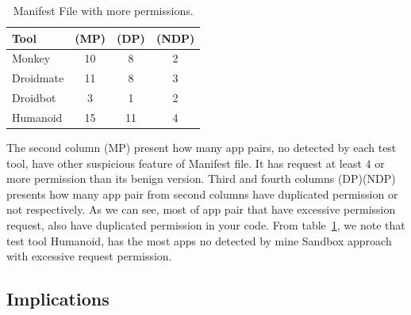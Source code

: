 \begin{table}[ht]
  \caption{Manifest File with more permissions.}
  \centering
  \begin{small}
 \begin{tabular}{lccc}
   \toprule
   Tool & (MP) & (DP) & (NDP) \\   \midrule
   Monkey &  10 & 8 & 2 \\ 
   Droidmate &  11 & 8 & 3 \\ 
   Droidbot &  3 & 1 & 2 \\ 
   Humanoid &  15 & 11 & 4 \\ 
 \bottomrule
 \end{tabular}
 \end{small}
 \label{tab:mp}
\end{table}

The second column (MP) present how many app pairs, no detected by each test tool, have other suspicious feature of Manifest file. It has request at least $4$ or more permission than its benign version. Third and fourth columns (DP)(NDP) presents how many app pair from second columns have duplicated permission or not respectively. As we can see, most of app pair that have excessive permission request, also have duplicated permission in your code. From table~\ref{tab:mp}, we note that test tool Humanoid, has the most apps no detected by mine Sandbox approach with excessive request permission.


\subsection{Implications}\label{sec:implications}